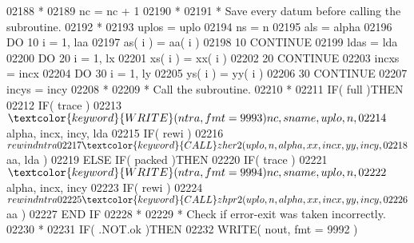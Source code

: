 \begin{DoxyCode}
02188 \textcolor{comment}{*}
02189                      nc = nc + 1
02190 \textcolor{comment}{*}
02191 \textcolor{comment}{*                    Save every datum before calling the subroutine.}
02192 \textcolor{comment}{*}
02193                      uplos = uplo
02194                      ns = n
02195                      als = alpha
02196                      \textcolor{keywordflow}{DO} 10 i = 1, laa
02197                         as( i ) = aa( i )
02198    10                \textcolor{keywordflow}{CONTINUE}
02199                      ldas = lda
02200                      \textcolor{keywordflow}{DO} 20 i = 1, lx
02201                         xs( i ) = xx( i )
02202    20                \textcolor{keywordflow}{CONTINUE}
02203                      incxs = incx
02204                      \textcolor{keywordflow}{DO} 30 i = 1, ly
02205                         ys( i ) = yy( i )
02206    30                \textcolor{keywordflow}{CONTINUE}
02207                      incys = incy
02208 \textcolor{comment}{*}
02209 \textcolor{comment}{*                    Call the subroutine.}
02210 \textcolor{comment}{*}
02211                      \textcolor{keywordflow}{IF}( full )\textcolor{keywordflow}{THEN}
02212                         \textcolor{keywordflow}{IF}( trace )
02213      $                     \textcolor{keyword}{WRITE}( ntra, fmt = 9993 )nc, sname, uplo, n,
02214      $                     alpha, incx, incy, lda
02215                         \textcolor{keywordflow}{IF}( rewi )
02216      $                     rewind ntra
02217                         \textcolor{keyword}{CALL }zher2( uplo, n, alpha, xx, incx, yy, incy,
02218      $                              aa, lda )
02219                      \textcolor{keywordflow}{ELSE} \textcolor{keywordflow}{IF}( packed )\textcolor{keywordflow}{THEN}
02220                         \textcolor{keywordflow}{IF}( trace )
02221      $                     \textcolor{keyword}{WRITE}( ntra, fmt = 9994 )nc, sname, uplo, n,
02222      $                     alpha, incx, incy
02223                         \textcolor{keywordflow}{IF}( rewi )
02224      $                     rewind ntra
02225                         \textcolor{keyword}{CALL }zhpr2( uplo, n, alpha, xx, incx, yy, incy,
02226      $                              aa )
02227 \textcolor{keywordflow}{                     END IF}
02228 \textcolor{comment}{*}
02229 \textcolor{comment}{*                    Check if error-exit was taken incorrectly.}
02230 \textcolor{comment}{*}
02231                      \textcolor{keywordflow}{IF}( .NOT.ok )\textcolor{keywordflow}{THEN}
02232                         \textcolor{keyword}{WRITE}( nout, fmt = 9992 )

\end{DoxyCode}
